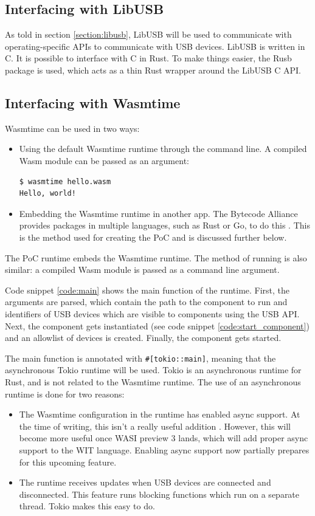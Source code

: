 \subsection{Interfacing with LibUSB}
As told in section \ref{section:libusb}, LibUSB will be used to communicate with operating-specific APIs to communicate with USB devices. LibUSB is written in C. It is possible to interface with C in Rust. To make things easier, the Rusb package is used, which acts as a thin Rust wrapper around the LibUSB C API.

\subsection{Interfacing with Wasmtime}
Wasmtime can be used in two ways: 
\begin{itemize}
\item Using the default Wasmtime runtime through the command line. A compiled \acrshort{Wasm} module can be passed as an argument:
\begin{verbatim}
$ wasmtime hello.wasm
Hello, world!
\end{verbatim}
\item Embedding the Wasmtime runtime in another app. The Bytecode Alliance provides packages in multiple languages, such as Rust or Go, to do this \cite{wasmtime_website}. This is the method used for creating the \acrshort{PoC} and is discussed further below.
\end{itemize}

The \acrshort{PoC} runtime embeds the Wasmtime runtime. The method of running is also similar: a compiled \acrshort{Wasm} module is passed as a command line argument.

Code snippet \ref{code:main} shows the main function of the runtime. First, the arguments are parsed, which contain the path to the component to run and identifiers of USB devices which are visible to components using the \acrshort{USB} \acrshort{API}. Next, the component gets instantiated (see code snippet \ref{code:start_component}) and an allowlist of devices is created. Finally, the component gets started.

The main function is annotated with \texttt{\#[tokio::main]}, meaning that the asynchronous Tokio runtime \cite{tokio} will be used. Tokio is an asynchronous runtime for Rust, and is not related to the Wasmtime runtime. The use of an asynchronous runtime is done for two reasons:
\begin{itemize}
\item The Wasmtime configuration in the runtime has enabled async support. At the time of writing, this isn't a really useful addition \cite{wasmtime_async_config}. However, this will become more useful once \acrshort{WASI} preview 3 lands, which will add proper async support to the \acrshort{WIT} language. Enabling async support now partially prepares for this upcoming feature.

\item The runtime receives updates when USB devices are connected and disconnected. This feature runs blocking functions which run on a separate thread. Tokio makes this easy to do.\\
\end{itemize}


